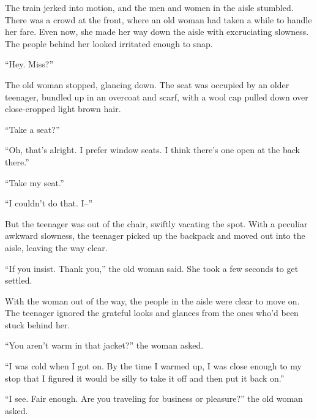 





The train jerked into motion, and the men and women in the aisle stumbled.  There was a crowd at the front, where an old woman had taken a while to handle her fare.  Even now, she made her way down the aisle with excruciating slowness.  The people behind her looked irritated enough to snap.



``Hey.  Miss?''



The old woman stopped, glancing down.  The seat was occupied by an older teenager, bundled up in an overcoat and scarf, with a wool cap pulled down over close-cropped light brown hair.



``Take a seat?''



``Oh, that's alright.  I prefer window seats.  I think there's one open at the back there.''



``Take my seat.''



``I couldn't do that.  I--''



But the teenager was out of the chair, swiftly vacating the spot.  With a peculiar awkward slowness, the teenager picked up the backpack and moved out into the aisle, leaving the way clear.



``If you insist.  Thank you,'' the old woman said.  She took a few seconds to get settled.



With the woman out of the way, the people in the aisle were clear to move on.  The teenager ignored the grateful looks and glances from the ones who'd been stuck behind her.



``You aren't warm in that jacket?'' the woman asked.



``I was cold when I got on.  By the time I warmed up, I was close enough to my stop that I figured it would be silly to take it off and then put it back on.''



``I see.  Fair enough.  Are you traveling for business or pleasure?'' the old woman asked.



